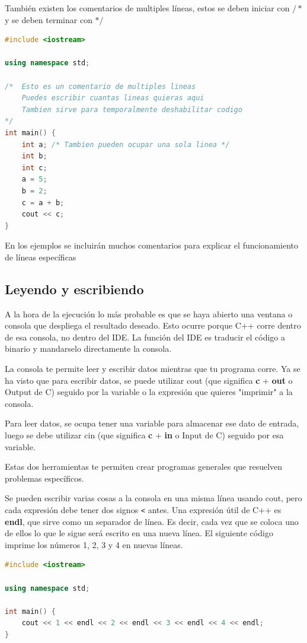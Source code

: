 \documentclass{article}
\begin{document}
También existen los comentarios de multiples líneas, estos se deben iniciar con $/*$ y se deben terminar con $*/$

\begin{lstlisting}[language=C++, title=Comentarios]
#include <iostream>

using namespace std;

/*  Esto es un comentario de multiples lineas
    Puedes escribir cuantas lineas quieras aqui
    Tambien sirve para temporalmente deshabilitar codigo
*/
int main() {
	int a; /* Tambien pueden ocupar una sola linea */
	int b;
	int c;
	a = 5;
	b = 2;
	c = a + b;
	cout << c;
}
\end{lstlisting}

En los ejemplos se incluirán muchos comentarios para explicar el funcionamiento de líneas específicas

\subsection{Leyendo y escribiendo}

A la hora de la ejecución lo más probable es que se haya abierto una ventana o consola que despliega el resultado deseado. Esto ocurre porque C++ corre dentro de esa consola, no dentro del IDE. La función del IDE es traducir el código a binario y mandarselo directamente la consola.

La consola te permite leer y escribir datos mientras que tu programa corre. Ya se ha visto que para escribir datos, se puede utilizar cout (que significa \textbf{c} + \textbf{out} o Output de C) seguido por la variable o la expresión que quieres "imprimir" a la consola.

Para leer datos, se ocupa tener una variable para almacenar ese dato de entrada, luego se debe utilizar cin (que significa \textbf{c} + \textbf{in} o Input de C) seguido por esa variable.

Estas dos herramientas te permiten crear programas generales que resuelven problemas específicos.

Se pueden escribir varias cosas a la consola en una misma línea usando cout, pero cada expresión debe tener dos signos \lstinline{<} antes. Una expresión útil de C++ es \textbf{endl}, que sirve como un separador de línea. Es decir, cada vez que se coloca uno de ellos lo que le sigue será escrito en una nueva línea. El siguiente código imprime los números 1, 2, 3 y 4 en nuevas líneas.

\begin{lstlisting}[language=C++, title=Uno a cuatro]
#include <iostream>

using namespace std;

int main() {
	cout << 1 << endl << 2 << endl << 3 << endl << 4 << endl;
}
\end{lstlisting}
\end{document}
